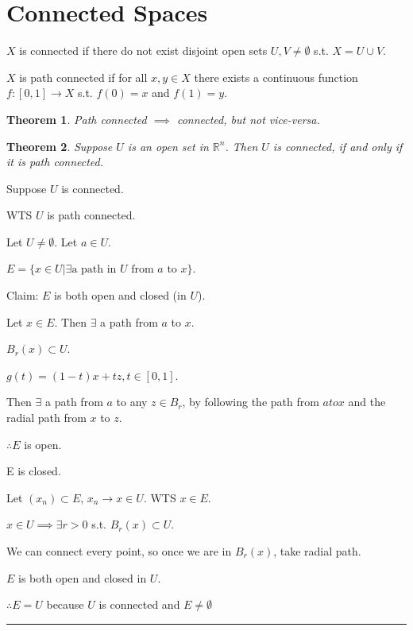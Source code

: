 \documentclass[twoside]{article}
\newcounter{lecnum}
\newtheorem{theorem}{Theorem}[lecnum]
\newenvironment{proof}{{\bf Proof:}}{\hfill\rule{2mm}{2mm}}
\newcommand\R{\mathbb{R}}
\begin{document}
\section{Connected Spaces}
    $X$ is connected if there do not exist disjoint open sets $U, V \neq \emptyset$ s.t. $X = U \cup V$. 

    $X$ is path connected if for all $x,y \in X$ there exists a continuous function $f:[0,1] \rightarrow X$ s.t. $f(0) = x$ and $f(1) = y$. 

    \begin{theorem}
        Path connected $\implies$ connected, but not vice-versa.  
    \end{theorem}

    \begin{theorem}
        Suppose $U$ is an open set in $\R^n$. Then $U$ is connected, if and only if it is path connected. 
    \end{theorem}

    \begin{proof}
        Suppose $U$ is connected. 

        WTS $U$ is path connected. 

        Let $U \neq \emptyset$. Let $a \in U$. 
        
        $E = \{x\in U \vert \exists\text{a path in $U$ from $a$ to $x$}\}$.

        Claim: $E$ is both open and closed (in $U$). 

        Let $x \in E$. Then $\exists$ a path from $a$ to $x$. 

        $B_r(x) \subset U$. 

        $g(t)  = (1-t)x+tz, t \in [0,1]$. 

        Then $\exists $ a path from $a$ to any $z \in B_r$, by following the path from $a to x$ and the radial path from $x$ to $z$. 

        $\therefore E$ is open. 

        E is closed. 

        Let $(x_n) \subset E$, $x_n \rightarrow x \in U$. WTS $x \in E$. 

        $x \in U \implies \exists r > 0$ s.t. $B_r(x) \subset U$. 

        We can connect every point, so once we are in $B_r(x)$, take radial path. 

        $E$ is both open and closed in $U$.

        $\therefore E = U$ because $U$ is connected and $E \neq \emptyset$
    \end{proof}
\end{document}
